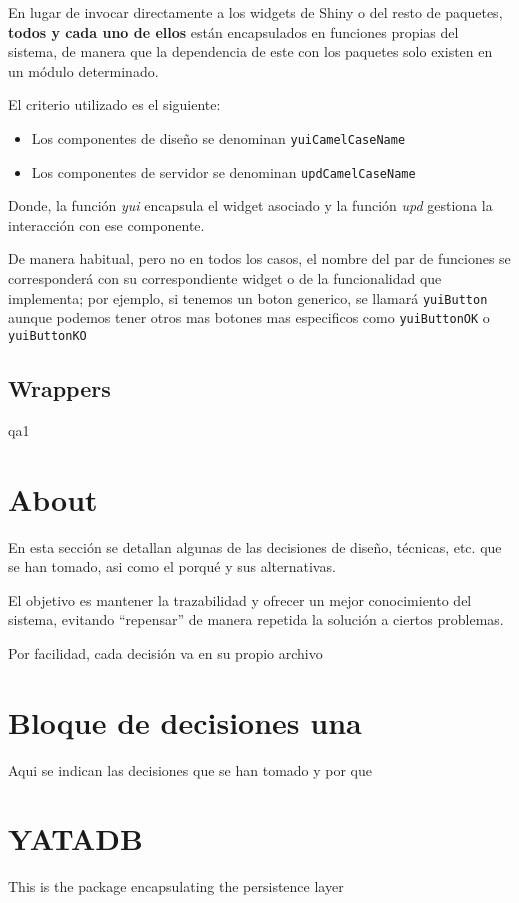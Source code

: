 \documentclass[
]{book}
\providecommand{\tightlist}{%
  \setlength{\itemsep}{0pt}\setlength{\parskip}{0pt}}
\begin{document}
En lugar de invocar directamente a los widgets de Shiny o del resto de paquetes, \textbf{todos y cada uno de ellos} están encapsulados en funciones propias del sistema, de manera que la dependencia de este con los paquetes solo existen en un módulo determinado.

El criterio utilizado es el siguiente:

\begin{itemize}
\tightlist
\item
  Los componentes de diseño se denominan \texttt{yuiCamelCaseName}
\item
  Los componentes de servidor se denominan \texttt{updCamelCaseName}
\end{itemize}

Donde, la función \emph{yui} encapsula el widget asociado y la función \emph{upd} gestiona la interacción con ese componente.

De manera habitual, pero no en todos los casos, el nombre del par de funciones se corresponderá con su correspondiente widget o de la funcionalidad que implementa; por ejemplo, si tenemos un boton generico, se llamará \texttt{yuiButton} aunque podemos tener otros mas botones mas especificos como \texttt{yuiButtonOK} o \texttt{yuiButtonKO}

\hypertarget{wrappers}{%
\subsection{Wrappers}\label{wrappers}}

qa1

\hypertarget{about}{%
\section{About}\label{about}}

En esta sección se detallan algunas de las decisiones de diseño, técnicas, etc. que se han tomado, asi como el porqué y sus alternativas.

El objetivo es mantener la trazabilidad y ofrecer un mejor conocimiento del sistema, evitando ``repensar'' de manera repetida la solución a ciertos problemas.

Por facilidad, cada decisión va en su propio archivo

\hypertarget{bloque-de-decisiones-una}{%
\section{Bloque de decisiones una}\label{bloque-de-decisiones-una}}

Aqui se indican las decisiones que se han tomado y por que

\hypertarget{yatadb}{%
\section{YATADB}\label{yatadb}}

This is the package encapsulating the persistence layer
\end{document}
